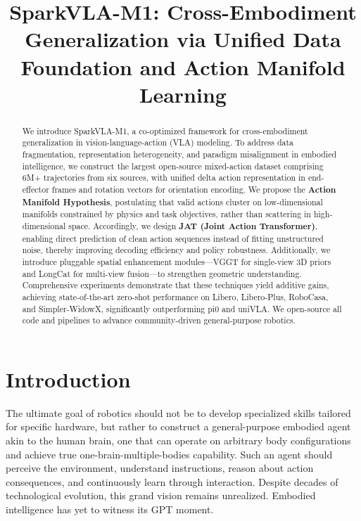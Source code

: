 \documentclass[11pt,a4paper]{article}
\begin{document}
\title{SparkVLA-M1: Cross-Embodiment Generalization via Unified Data Foundation and Action Manifold Learning}

\author{}
\date{}

\maketitle

\begin{abstract}
We introduce SparkVLA-M1, a co-optimized framework for cross-embodiment generalization in vision-language-action (VLA) modeling. To address data fragmentation, representation heterogeneity, and paradigm misalignment in embodied intelligence, we construct the largest open-source mixed-action dataset comprising 6M+ trajectories from six sources, with unified delta action representation in end-effector frames and rotation vectors for orientation encoding. We propose the \textbf{Action Manifold Hypothesis}, postulating that valid actions cluster on low-dimensional manifolds constrained by physics and task objectives, rather than scattering in high-dimensional space. Accordingly, we design \textbf{JAT (Joint Action Transformer)}, enabling direct prediction of clean action sequences instead of fitting unstructured noise, thereby improving decoding efficiency and policy robustness. Additionally, we introduce pluggable spatial enhancement modules---VGGT for single-view 3D priors and LongCat for multi-view fusion---to strengthen geometric understanding. Comprehensive experiments demonstrate that these techniques yield additive gains, achieving state-of-the-art zero-shot performance on Libero, Libero-Plus, RoboCasa, and Simpler-WidowX, significantly outperforming pi0 and uniVLA. We open-source all code and pipelines to advance community-driven general-purpose robotics.
\end{abstract}

\section{Introduction}

The ultimate goal of robotics should not be to develop specialized skills tailored for specific hardware, but rather to construct a general-purpose embodied agent akin to the human brain, one that can operate on arbitrary body configurations and achieve true one-brain-multiple-bodies capability. Such an agent should perceive the environment, understand instructions, reason about action consequences, and continuously learn through interaction. Despite decades of technological evolution, this grand vision remains unrealized. Embodied intelligence has yet to witness its GPT moment.
\end{document}
